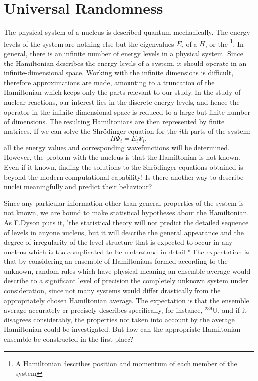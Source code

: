 \section*{Universal Randomness}
The physical system of a nucleus is described quantum mechanically.\cite{mehta} The energy levels of the system are nothing else but the eigenvalues $E_i$ of a  $H$, or the \footnote{A Hamiltonian describes position and momentum of each member of the system}. In general, there is an infinite number of energy levels in a physical system. Since the Hamiltonian describes the energy levels of a system, it should operate in an infinite-dimensional space. Working with the infinite dimensions is difficult, therefore approximations are made, amounting to a truncation of the Hamiltonian which keeps only the parts relevant to our study. In the study of nuclear reactions, our interest lies in the discrete energy levels, and hence the operator in the infinite-dimensional space is reduced to a large but finite number of dimensions. The resulting Hamiltonians are then represented by finite matrices. If we can solve the Shr\"{o}dinger equation for the $i$th parts of the system:
\begin{equation*}
H\Psi_i=E_i\Psi_i,
\end{equation*}
all the energy values and corresponding wavefunctions will be determined. However, the problem with the nucleus is that the Hamiltonian is not known. Even if it  known, finding the solutions to the Shr\"{o}dinger equations obtained is beyond the modern computational capability! Is there another way to describe nuclei meaningfully and predict their behaviour?

Since any particular information other than general properties of the system is not known, we are bound to make statistical hypotheses about the Hamiltonian. As F.Dyson puts it, "the statistical theory will not predict the detailed sequence of levels in anyone nucleus, but it will describe the general appearance and the degree of irregularity of the level structure that is expected to occur in any nucleus which is too complicated to be understood in detail."\cite{dy62}  The expectation is that by considering an ensemble of Hamiltonians formed according to the unknown, random rules which have physical meaning an ensemble average would describe to a significant level of precision the completely unknown system under consideration, since not many systems would differ drastically from the appropriately chosen Hamiltonian average. The expectation is  that the ensemble average accurately or precisely describes specifically, for instance, $^{239}$U, and if it disagrees considerably, the properties not taken into account by the average Hamiltonian could be investigated. But how can the appropriate Hamiltonian ensemble be constructed in the first place?

